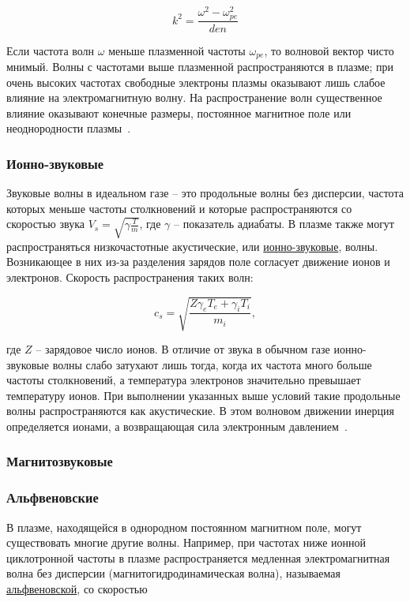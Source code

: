 \documentclass[10pt, a4paper]{article}
\begin{document}
\begin{equation*}
	k^2 = \frac{\omega^2-\omega_{pe}^2}{den}
\end{equation*}

Если частота волн $\omega$ меньше плазменной частоты $\omega_{pe}$, то волновой вектор чисто мнимый. Волны с частотами выше плазменной распространяются в плазме; при очень высоких частотах свободные электроны плазмы оказывают лишь слабое влияние на электромагнитную волну. На распространение волн существенное влияние оказывают конечные размеры, постоянное магнитное поле или неоднородности плазмы~\cite{kroll}.

\subsubsection{Ионно-звуковые}

Звуковые волны в идеальном газе -- это продольные волны без  дисперсии, частота которых меньше частоты столкновений и которые  распространяются со скоростью звука $V_s=\sqrt{\gamma\frac{T}{m}}$, где $\gamma$ -- показатель адиабаты. В плазме также могут  распространяться низкочастотные акустические, или \uline{ионно-звуковые}, волны.  Возникающее в них из-за разделения зарядов поле согласует движение ионов и электронов. Скорость распространения таких волн:

\begin{equation*}
	c_s = \sqrt{\frac{Z\gamma_eT_e+\gamma_iT_i}{m_i}},
\end{equation*}

где $Z$ -- зарядовое число ионов. В отличие от звука в обычном газе ионно-звуковые волны слабо затухают лишь тогда, когда их частота много больше частоты столкновений, а температура электронов значительно превышает температуру ионов. При выполнении указанных выше условий такие продольные волны распространяются как акустические. В этом волновом движении инерция определяется ионами, а возвращающая сила электронным давлением~\cite{kroll}.

\subsubsection{Магнитозвуковые}



\subsubsection{Альфвеновские}

В плазме, находящейся в однородном постоянном магнитном поле, могут существовать многие другие волны. Например, при частотах ниже ионной циклотронной частоты в плазме распространяется медленная  электромагнитная волна без дисперсии (магнитогидродинамическая волна), называемая \uline{альфвеновской}, со скоростью 
\end{document}
